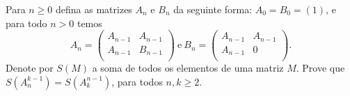 Para \( n\geq 0\) defina as matrizes \( A_n\) e \( B_n\) da seguinte forma: \( A_0 = B_0 = (1)\), e para todo \( n>0\) temos
\[ A_n = \left( \begin{array}{cc} A_{n - 1} & A_{n - 1} \\
A_{n - 1} & B_{n - 1} \\
\end{array} \right) \ \textrm{e} \ B_n = \left( \begin{array}{cc} A_{n - 1} & A_{n - 1} \\
A_{n - 1} & 0 \\
\end{array} \right).
\]
Denote por \( S(M)\) a soma de todos os elementos de uma matriz \( M\). Prove que \( S(A_n^{k - 1}) = S(A_k^{n - 1})\), para todos \( n,k\geq 2\).
